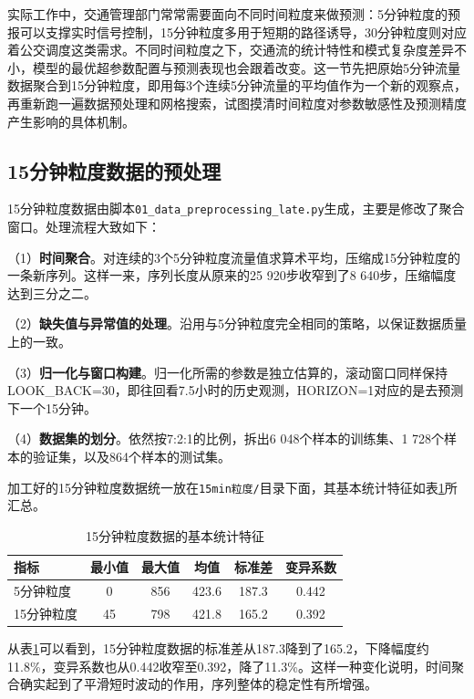 \documentclass[12pt,a4paper,oneside]{ctexbook}
\begin{document}
	实际工作中，交通管理部门常常需要面向不同时间粒度来做预测：5分钟粒度的预报可以支撑实时信号控制，15分钟粒度多用于短期的路径诱导，30分钟粒度则对应着公交调度这类需求。不同时间粒度之下，交通流的统计特性和模式复杂度差异不小，模型的最优超参数配置与预测表现也会跟着改变。这一节先把原始5分钟流量数据聚合到15分钟粒度，即用每3个连续5分钟流量的平均值作为一个新的观察点，再重新跑一遍数据预处理和网格搜索，试图摸清时间粒度对参数敏感性及预测精度产生影响的具体机制。
	
	\subsection{15分钟粒度数据的预处理}
	
	15分钟粒度数据由脚本\texttt{01\_data\_preprocessing\_late.py}生成，主要是修改了聚合窗口。处理流程大致如下：
	
	（1）\textbf{时间聚合}。对连续的3个5分钟粒度流量值求算术平均，压缩成15分钟粒度的一条新序列。这样一来，序列长度从原来的25 920步收窄到了8 640步，压缩幅度达到三分之二。
	
	（2）\textbf{缺失值与异常值的处理}。沿用与5分钟粒度完全相同的策略，以保证数据质量上的一致。
	
	（3）\textbf{归一化与窗口构建}。归一化所需的参数是独立估算的，滚动窗口同样保持LOOK\_BACK=30，即往回看7.5小时的历史观测，HORIZON=1对应的是去预测下一个15分钟。
	
	（4）\textbf{数据集的划分}。依然按7:2:1的比例，拆出6 048个样本的训练集、1 728个样本的验证集，以及864个样本的测试集。
	
	加工好的15分钟粒度数据统一放在\texttt{15min粒度/}目录下面，其基本统计特征如表\ref{tab:15min_stats}所汇总。
	
	\begin{table}[H]
		\centering
		\caption{15分钟粒度数据的基本统计特征}
		\label{tab:15min_stats}
		\begin{tabular}{lccccc}
			\toprule
			指标 & 最小值 & 最大值 & 均值 & 标准差 & 变异系数 \\
			\midrule
			5分钟粒度  & 0 & 856 & 423.6 & 187.3 & 0.442 \\
			15分钟粒度 & 45 & 798 & 421.8 & 165.2 & 0.392 \\
			\bottomrule
		\end{tabular}
	\end{table}
	
	从表\ref{tab:15min_stats}可以看到，15分钟粒度数据的标准差从187.3降到了165.2，下降幅度约11.8\%，变异系数也从0.442收窄至0.392，降了11.3\%。这样一种变化说明，时间聚合确实起到了平滑短时波动的作用，序列整体的稳定性有所增强。
	
\end{document}
